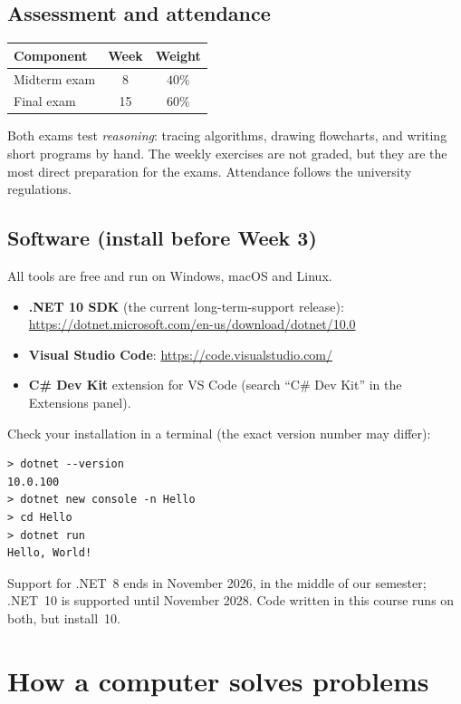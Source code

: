 \documentclass[11pt,a4paper]{article}
\begin{document}
\subsection{Assessment and attendance}
\begin{center}
\begin{tabular}{lcc}
\toprule
Component & Week & Weight\\ \midrule
Midterm exam & 8 & $40\%$\\
Final exam & 15 & $60\%$\\ \bottomrule
\end{tabular}
\end{center}
Both exams test \emph{reasoning}: tracing algorithms, drawing flowcharts, and writing short programs by hand. The weekly exercises are not graded, but they are the most direct preparation for the exams. Attendance follows the university regulations.

\subsection{Software (install before Week 3)}
All tools are free and run on Windows, macOS and Linux.
\begin{itemize}[leftmargin=*,itemsep=1pt]
  \item \textbf{.NET 10 SDK} (the current long-term-support release): \url{https://dotnet.microsoft.com/en-us/download/dotnet/10.0}
  \item \textbf{Visual Studio Code}: \url{https://code.visualstudio.com/}
  \item \textbf{C\# Dev Kit} extension for VS Code (search ``C\# Dev Kit'' in the Extensions panel).
\end{itemize}
Check your installation in a terminal (the exact version number may differ):
\begin{lstlisting}[style=shell]
> dotnet --version
10.0.100
> dotnet new console -n Hello
> cd Hello
> dotnet run
Hello, World!
\end{lstlisting}
\begin{notebox}
Support for .NET~8 ends in November 2026, in the middle of our semester; .NET~10 is supported until November 2028. Code written in this course runs on both, but install~10.
\end{notebox}

\section{How a computer solves problems}\label{sec:computer}
\end{document}
